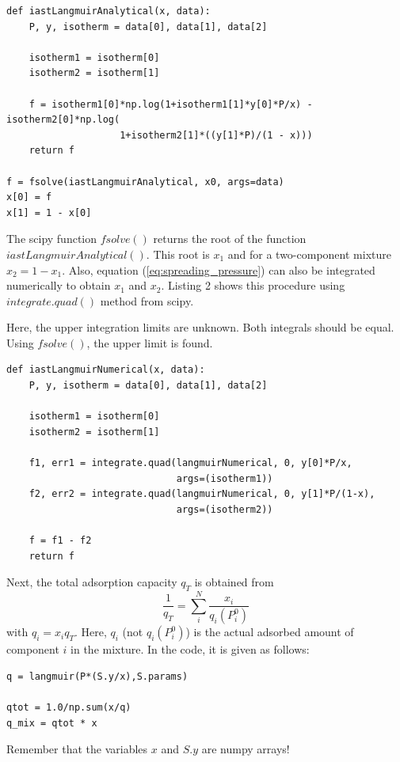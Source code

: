 \documentclass{article}
\begin{document}
\begin{lstlisting}[caption={Find root of equation (\ref{eq:find_root_analytical}) and obtain $x_1$ using analytical integrating of the Gibbs isotherm.}]
def iastLangmuirAnalytical(x, data):
    P, y, isotherm = data[0], data[1], data[2]

    isotherm1 = isotherm[0]
    isotherm2 = isotherm[1]

    f = isotherm1[0]*np.log(1+isotherm1[1]*y[0]*P/x) - isotherm2[0]*np.log(
                    1+isotherm2[1]*((y[1]*P)/(1 - x)))
    return f
   
f = fsolve(iastLangmuirAnalytical, x0, args=data)
x[0] = f
x[1] = 1 - x[0]
\end{lstlisting}

The scipy function $fsolve()$ returns the root of the function $iastLangmuirAnalytical()$. This root is $x_1$ and for a two-component mixture $x_2 = 1 - x_1$. Also, equation (\ref{eq:spreading_pressure}) can also be integrated numerically to obtain $x_1$ and $x_2$. Listing 2 shows this procedure using $integrate.quad()$ method from scipy.

Here, the upper integration limits are unknown. Both integrals should be equal. Using $fsolve()$, the upper limit is found.

\begin{lstlisting}[caption={Numerical integration of the Gibbs isotherm to obtain $x_1$ and $x_2$.}]
def iastLangmuirNumerical(x, data):
    P, y, isotherm = data[0], data[1], data[2]

    isotherm1 = isotherm[0]
    isotherm2 = isotherm[1]

    f1, err1 = integrate.quad(langmuirNumerical, 0, y[0]*P/x,
                              args=(isotherm1))
    f2, err2 = integrate.quad(langmuirNumerical, 0, y[1]*P/(1-x),
                              args=(isotherm2))

    f = f1 - f2
    return f
\end{lstlisting}


Next, the total adsorption capacity $q_T$ is obtained from
%
\begin{equation}
        \frac{1}{q_T} = \sum_{i}^N\frac{x_i}{q_i(P_i^0)}
	\label{eq:total_adsorbed_loading}
\end{equation}
%
with $q_i={x_i}q_T$. Here, $q_i$ (not $q_i(P_i^0)$) is the actual adsorbed amount of component $i$ in the mixture. In the code, it is given as follows: 
%
\begin{lstlisting}[caption={Compute the mixture adsorption isotherms based on equation (\ref{eq:total_adsorbed_loading}).}]
q = langmuir(P*(S.y/x),S.params)

qtot = 1.0/np.sum(x/q)
q_mix = qtot * x
\end{lstlisting}
%
Remember that the variables $x$ and $S.y$ are numpy arrays!
\end{document}
